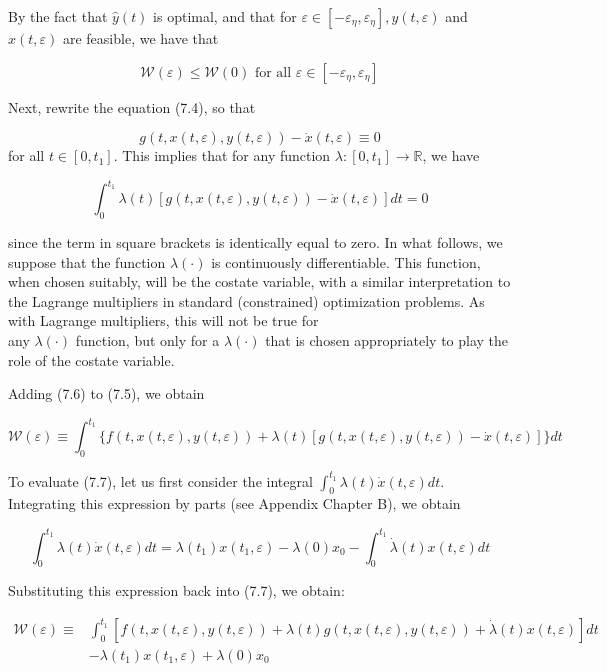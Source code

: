 \documentclass[\topdir/lecture_notes.tex]{subfiles}
\begin{document}
By the fact that $\hat{y}(t)$ is optimal, and that for $\varepsilon \in\left[-\varepsilon_{\eta}, \varepsilon_{\eta}\right], y(t, \varepsilon)$ and $x(t, \varepsilon)$ are feasible, we have that

\[
\mathcal{W}(\varepsilon) \leq \mathcal{W}(0) \text { for all } \varepsilon \in\left[-\varepsilon_{\eta}, \varepsilon_{\eta}\right]
\]

Next, rewrite the equation (7.4), so that

\[
g(t, x(t, \varepsilon), y(t, \varepsilon))-\dot{x}(t, \varepsilon) \equiv 0
\]
for all $t \in\left[0, t_{1}\right]$. This implies that for any function $\lambda:\left[0, t_{1}\right] \rightarrow \mathbb{R}$, we have

\[
\int_{0}^{t_{1}} \lambda(t)[g(t, x(t, \varepsilon), y(t, \varepsilon))-\dot{x}(t, \varepsilon)] d t=0
\]

since the term in square brackets is identically equal to zero. In what follows, we suppose that the function $\lambda(\cdot)$ is continuously differentiable. This function, when chosen suitably, will be the costate variable, with a similar interpretation to the Lagrange multipliers in standard (constrained) optimization problems. As with Lagrange multipliers, this will not be true for\\
any $\lambda(\cdot)$ function, but only for a $\lambda(\cdot)$ that is chosen appropriately to play the role of the costate variable.

Adding (7.6) to (7.5), we obtain

\[
\mathcal{W}(\varepsilon) \equiv \int_{0}^{t_{1}}\{f(t, x(t, \varepsilon), y(t, \varepsilon))+\lambda(t)[g(t, x(t, \varepsilon), y(t, \varepsilon))-\dot{x}(t, \varepsilon)]\} d t
\]

To evaluate (7.7), let us first consider the integral $\int_{0}^{t_{1}} \lambda(t) \dot{x}(t, \varepsilon) d t$. Integrating this expression by parts (see Appendix Chapter B), we obtain

\[
\int_{0}^{t_{1}} \lambda(t) \dot{x}(t, \varepsilon) d t=\lambda\left(t_{1}\right) x\left(t_{1}, \varepsilon\right)-\lambda(0) x_{0}-\int_{0}^{t_{1}} \dot{\lambda}(t) x(t, \varepsilon) d t
\]

Substituting this expression back into (7.7), we obtain:

\[
\begin{aligned}
\mathcal{W}(\varepsilon) \equiv & \int_{0}^{t_{1}}[f(t, x(t, \varepsilon), y(t, \varepsilon))+\lambda(t) g(t, x(t, \varepsilon), y(t, \varepsilon))+\dot{\lambda}(t) x(t, \varepsilon)] d t \\
& -\lambda\left(t_{1}\right) x\left(t_{1}, \varepsilon\right)+\lambda(0) x_{0}
\end{aligned}
\]
\end{document}
